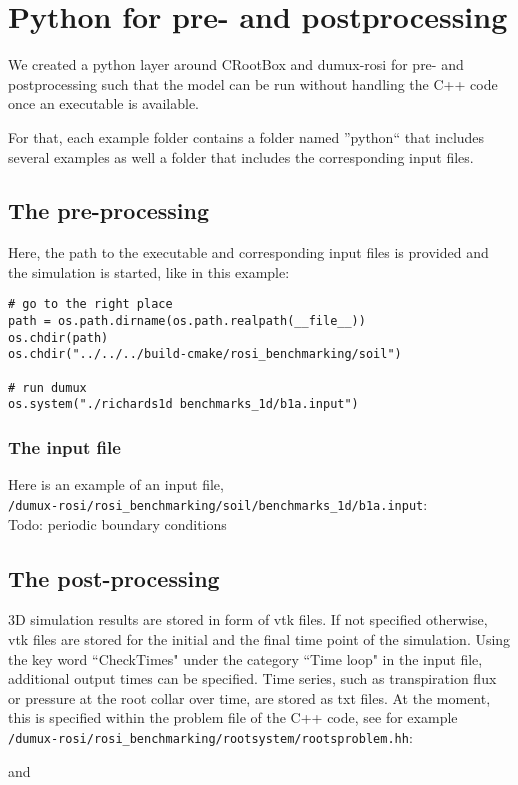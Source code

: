 \chapter*{Python for pre- and postprocessing}
We created a python layer around CRootBox and dumux-rosi for pre- and postprocessing such that the model can be run without handling the C++ code once an executable is available. 

For that, each example folder contains a folder named ''python`` that includes several examples as well a folder that includes the corresponding input files. 

\section*{The pre-processing}
Here, the path to the executable and corresponding input files is provided and the simulation is started, like in this example: 
\begin{lstlisting}
# go to the right place
path = os.path.dirname(os.path.realpath(__file__))
os.chdir(path)
os.chdir("../../../build-cmake/rosi_benchmarking/soil")

# run dumux
os.system("./richards1d benchmarks_1d/b1a.input")
\end{lstlisting}

\subsection*{The input file}
Here is an example of an input file,\\
\verb+/dumux-rosi/rosi_benchmarking/soil/benchmarks_1d/b1a.input+:
	\\

Todo: periodic boundary conditions

\section*{The post-processing}
3D simulation results are stored in form of vtk files. If not specified otherwise, vtk files are stored for the initial and the final time point of the simulation. Using the key word ``CheckTimes" under the category ``Time loop" in the input file, additional output times can be specified. Time series, such as transpiration flux or pressure at the root collar over time, are stored as txt files. At the moment, this is specified within the problem file of the C++ code, see for example\\
\verb+/dumux-rosi/rosi_benchmarking/rootsystem/rootsproblem.hh+:
	 
and
	  

